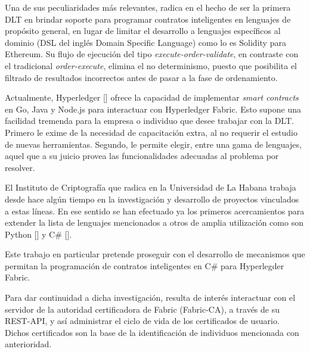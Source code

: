 Una de sus peculiaridades m\'as relevantes, radica en el hecho de ser la primera DLT en brindar soporte para programar contratos inteligentes en lenguajes de prop\'osito general, en lugar de limitar el desarrollo a lenguajes espec\'ificos al dominio (DSL del ingl\'es Domain Specific Language) como lo es Solidity para Ethereum. Su flujo de ejecuci\'on del tipo \emph{execute-order-validate}, en contraste con el tradicional \emph{order-execute}, elimina el no determinismo, puesto que posibilita el filtrado de resultados incorrectos antes de pasar a la fase de ordenamiento. 


Actualmente, Hyperledger [\cite{hyperledgerorg}] ofrece la capacidad de implementar \emph{smart contracts} en Go, Java y Node.js para interactuar con Hyperledger Fabric. Esto supone una facilidad tremenda para la empresa o individuo que desee trabajar con la DLT. Primero le exime de la necesidad de capacitaci\'on extra, al no requerir el estudio de nuevas herramientas. Segundo, le permite elegir, entre una gama de lenguajes, aquel que a su juicio provea las funcionalidades adecuadas al problema por resolver.%

El Instituto de Criptograf\'ia que radica en la Universidad de La Habana trabaja desde hace alg\'un tiempo en la investigaci\'on y desarrollo de proyectos vinculados a estas l\'ineas. En ese sentido se han efectuado ya los primeros acercamientos para extender la lista de lenguajes mencionados a otros de amplia utilizaci\'on como son Python [\cite{chaincode22python}] y C\# [\cite{chaincode22csharp}].

Este trabajo en particular pretende proseguir con el desarrollo de mecanismos que permitan la programaci\'on de contratos inteligentes en C\# para Hyperlegder Fabric.

Para dar continuidad a dicha investigaci\'on, resulta de inter\'es interactuar con el servidor de la autoridad certificadora de Fabric (Fabric-CA), a trav\'es de su REST-API, y as\'i administrar el ciclo de vida de los certificados de usuario. Dichos certificados son la base de la identificaci\'on de individuos mencionada con anterioridad. 

